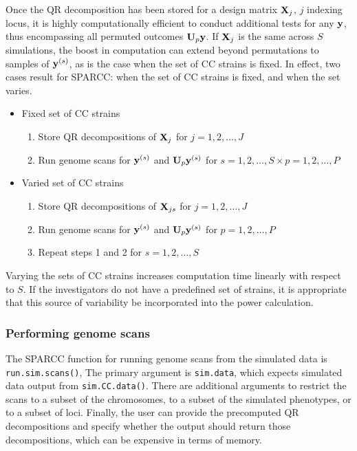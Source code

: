 Once the QR decomposition has been stored for a design matrix $\mathbf{X}_{j}$, $j$ indexing locus, it is highly computationally efficient to conduct additional tests for any $\mathbf{y}$, thus encompassing all permuted outcomes $\mathbf{U}_{p}\mathbf{y}$. If $\mathbf{X}_{j}$ is the same across $S$ simulations, the boost in computation can extend beyond permutations to samples of $\mathbf{y}^{(s)}$, as is the case when the set of CC strains is fixed. In effect, two cases result for SPARCC: when the set of CC strains is fixed, and when the set varies.
\begin{itemize}
	\item Fixed set of CC strains
    \begin{enumerate}
    	\item Store QR decompositions of $\mathbf{X}_{j}$ for $j=1, 2, \ldots, J$
        \item Run genome scans for $\mathbf{y}^{(s)}$ and $\mathbf{U}_{p}\mathbf{y}^{(s)}$ for $s=1, 2, \ldots, S \times p=1, 2, \ldots, P$
    \end{enumerate}
    \item Varied set of CC strains
    \begin{enumerate}
    	\item Store QR decompositions of $\mathbf{X}_{js}$ for $j=1, 2, \ldots, J$
        \item Run genome scans for $\mathbf{y}^{(s)}$ and $\mathbf{U}_{p}\mathbf{y}^{(s)}$ for $p=1, 2, \ldots, P$
        \item Repeat steps 1 and 2 for $s=1, 2, \ldots, S$
    \end{enumerate}
\end{itemize}
Varying the sets of CC strains increases computation time linearly with respect to $S$. If the investigators do not have a predefined set of strains, it is appropriate that this source of variability be incorporated into the power calculation.


\subsubsection{Performing genome scans}

The SPARCC function for running genome scans from the simulated data is \texttt{run.sim.scans()}, The primary argument is \texttt{sim.data}, which expects simulated data output from \texttt{sim.CC.data()}. There are additional arguments to restrict the scans to a subset of the chromosomes, to a subset of the simulated phenotypes, or to a subset of loci. Finally, the user can provide the precomputed QR decompositions and specify whether the output should return those decompositions, which can be expensive in terms of memory.

